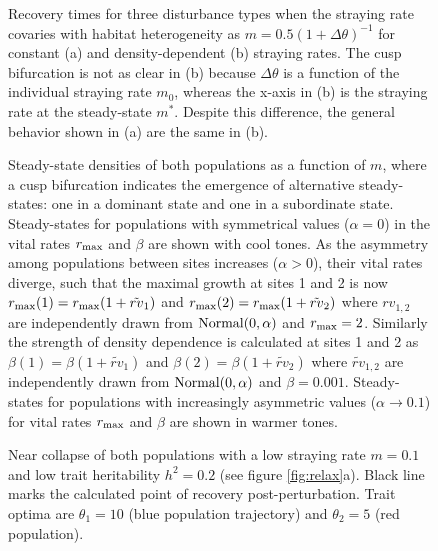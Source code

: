 \documentclass{revtex4}
\begin{document}
\begin{figure}
  \captionsetup{justification=raggedright,
singlelinecheck=false
}
  \centering
  \caption{
  Recovery times for three disturbance types when the straying rate covaries with habitat heterogeneity as $m = 0.5(1 + \Delta\theta)^{-1}$ for constant (a) and density-dependent (b) straying rates.
  The cusp bifurcation is not as clear in (b) because $\Delta\theta$ is a function of the individual straying rate $m_0$, whereas the x-axis in (b) is the straying rate at the steady-state $m^*$.
  Despite this difference, the general behavior shown in (a) are the same in (b).
  } \label{fig:mthetamvm}
\end{figure}

\begin{figure}
  \captionsetup{justification=raggedright,
singlelinecheck=false
}
\centering
\caption{
Steady-state densities of both populations as a function of $m$, where a cusp bifurcation indicates the emergence of alternative steady-states: one in a dominant state and one in a subordinate state.
Steady-states for populations with symmetrical values ($\alpha=0$) in the vital rates $r_{\rm max}$ and $\beta$ are shown with cool tones.
As the asymmetry among populations between sites increases ($\alpha>0$), their vital rates diverge, such that the maximal growth at sites 1 and 2 is now $r_{\rm max}(1)=r_{\rm max}(1+\tilde{rv}_1)$ and $r_{\rm max}(2)=r_{\rm max}(1+\tilde{rv}_2)$ where $rv_{1,2}$ are independently drawn from $\rm{Normal}(0,\alpha)$ and $r_{\rm max}=2$. 
Similarly the strength of density dependence is calculated at sites 1 and 2 as $\beta(1)=\beta(1+\tilde{rv}_1)$ and $\beta(2)=\beta(1+\tilde{rv}_2)$ where $\tilde{rv}_{1,2}$ are independently drawn from $\rm{Normal}(0,\alpha)$ and $\beta=0.001$.
Steady-states for populations with increasingly asymmetric values ($\alpha\rightarrow 0.1$) for vital rates $r_{\rm max}$ and $\beta$ are shown in warmer tones.
} \label{fig:symmetry}
\end{figure}


\begin{figure}
  \captionsetup{justification=raggedright,
singlelinecheck=false
}
\centering
\caption{
Near collapse of both populations with a low straying rate $m=0.1$ and low trait heritability $h^2=0.2$ (see figure \ref{fig:relax}a).
Black line marks the calculated point of recovery post-perturbation.
Trait optima are $\theta_1 = 10$ (blue population trajectory) and $\theta_2 = 5$ (red population).
} \label{fig:relaxtraj_bothlh}
\end{figure}
\end{document}

